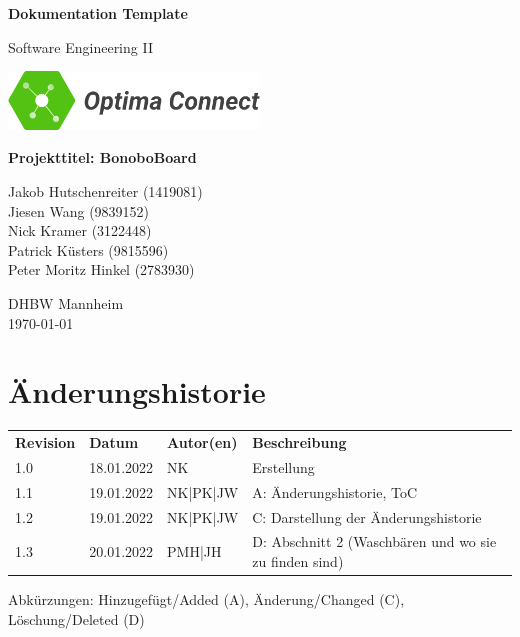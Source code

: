 \documentclass[a4paper,11pt]{scrartcl}
\begin{document}
\renewcommand*{\arraystretch}{1.2}
\begin{titlepage}
    \begin{center}
        \vspace*{1cm}\Huge
        \textbf{Dokumentation Template}\par                
        \vspace{0.5cm}\LARGE        
        Software Engineering II\par           
        \vspace{2cm}
        \includegraphics[width=0.5\textwidth]{OptimaLogo_long}\par   
        \vspace{1cm}
        \textbf{Projekttitel: BonoboBoard}\par        
        \vfill\Large   
        Jakob Hutschenreiter (1419081)\\Jiesen Wang (9839152)\\Nick Kramer (3122448)\\Patrick Küsters (9815596)\\Peter Moritz Hinkel (2783930)\par
        \vspace{2cm}
        DHBW Mannheim\\
        \today     
    \end{center}
\end{titlepage}

\section*{Änderungshistorie}
\begin{table}[h]
	\begin{tabular}{@{} p{20mm} p{25mm} p{25mm} p{75mm}}
		\textbf{Revision} & \textbf{Datum} & \textbf{Autor(en)} & \textbf{Beschreibung}\\
		1.0 & 18.01.2022 & NK & Erstellung\\
		1.1 & 19.01.2022 & NK|PK|JW & A: Änderungshistorie, ToC\\
		1.2 & 19.01.2022 & NK|PK|JW & C: Darstellung der Änderungshistorie\\
		1.3 & 20.01.2022 & PMH|JH & D: Abschnitt 2 (Waschbären und wo sie zu finden sind)
	\end{tabular}
\end{table}
\noindent
Abkürzungen: Hinzugefügt/Added (A), Änderung/Changed (C), Löschung/Deleted (D)
\vspace{2cm}
\tableofcontents
\newpage
{}
\end{document}
